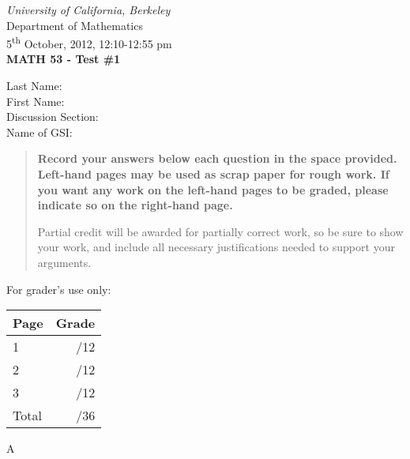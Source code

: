 \documentclass[12pt]{article}
\newcommand{\skipline}{\vspace{12pt}}
\begin{document}
\author{Instructor: Sean Fitzpatrick}
\thispagestyle{plain}
\begin{center}
\emph{University of California, Berkeley}\\
Department of Mathematics\\
5\textsuperscript{th} October, 2012, 12:10-12:55 pm\\
{\bf MATH 53 - Test \#1}\\
\end{center}
\skipline \skipline \skipline \noindent \skipline
Last Name:\underline{\hspace{350pt}}\\
\skipline
First Name:\underline{\hspace{348pt}}\\
\skipline
Discussion Section: \underline{\hspace{307pt}}\\
\skipline
Name of GSI: \underline{\hspace{336pt}}\\

\vspace{0.5in}


\begin{quote}
 {\bf Record your answers below each question in the space provided.    Left-hand pages may be used as scrap paper for rough work.  If you want any work on the left-hand pages to be graded, please indicate so on the right-hand page.
 
 \bigskip
 
Partial credit will be awarded for partially correct work, so be sure to show your work, and include all necessary justifications needed to support your arguments.}
\end{quote}


\vspace{0.5in}

For grader's use only:

\begin{table}[hbt]
\begin{center}
\begin{tabular}{|l|r|} \hline
Page&Grade\\
\hline \hline
\cline{1-2} 1 & \enspace\enspace\enspace\enspace\enspace\enspace/12\\
\cline{1-2} 2 & \enspace\enspace\enspace\enspace\enspace\enspace/12\\
\cline{1-2} 3 & \enspace\enspace\enspace\enspace\enspace\enspace/12\\
\cline{1-2} Total & \enspace\enspace\enspace\enspace\enspace\enspace/36\\
\hline
\end{tabular}

\skipline

\skipline

\skipline

\skipline

A
\end{center}
\end{table}
\newpage
\end{document}
